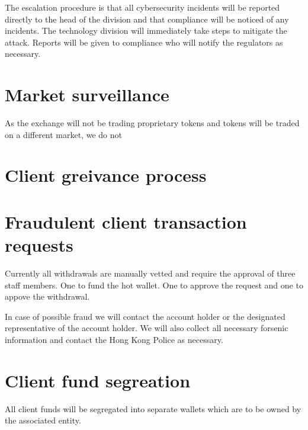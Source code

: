 The escalation procedure is that all cybersecurity incidents will be
reported directly to the head of the division and that compliance will
be noticed of any incidents.  The technology division will immediately
take steps to mitigate the attack.  Reports will be given to
compliance who will notify the regulators as necessary.


\section{Market surveillance}

As the exchange will not be trading proprietary tokens and tokens will
be traded on a different market, we do not 

\section{Client greivance process}

\section{Fraudulent client transaction requests}
Currently all withdrawals are manually vetted and require the approval
of three staff members.  One to fund the hot wallet.  One to approve
the request and one to appove the withdrawal.

In case of possible fraud we will contact the account holder or the
designated representative of the account holder.  We will also collect
all necessary forsenic information and contact the Hong Kong Police as
necessary.


\section{Client fund segreation}
All client funds will be segregated into separate wallets which are to
be owned by the associated entity.

